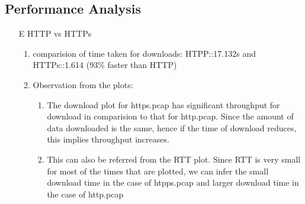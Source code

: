 \documentclass[12pt]{article}
\begin{document}
\subsection{Performance Analysis}
\begin{enumerate}
    \item[E] HTTP vs HTTPs
    \begin{enumerate}
        \item comparision of time taken for downloads: HTPP::17.132s and HTTPs::1.614 (93\% faster than HTTP)
        \item Observation from the plots: 
        \begin{enumerate}
            \item The download plot for https.pcap has significant throughput for download in comparision to that for http.pcap. Since the amount of data downloaded is the same, hence if the time of download reduces, this implies throughput increases.
            \item This can also be referred from the RTT plot. Since RTT is very small for most of the times that are plotted, we can infer the small download time in the case of htpps.pcap and larger download time in the case of http.pcap
        \end{enumerate}
         

\end{enumerate}
\end{enumerate}
\end{document}

